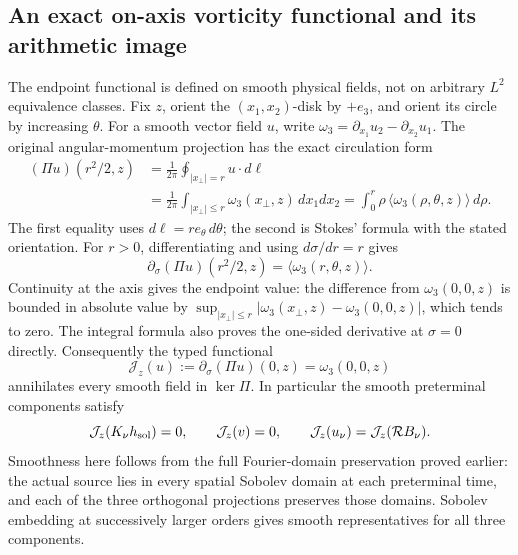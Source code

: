 \subsection*{An exact on-axis vorticity functional and its arithmetic image}

The endpoint functional is defined on smooth physical fields, not on
arbitrary \(L^2\) equivalence classes. Fix \(z\), orient the
\((x_1,x_2)\)-disk by \(+e_3\), and orient its circle by increasing
\(\theta\). For a smooth vector field \(u\), write
\(\omega_3=\partial_{x_1}u_2-\partial_{x_2}u_1\).
The original angular-momentum projection has the exact circulation form
\begin{align*}
 (\Pi u)(r^2/2,z)
 &=\frac1{2\pi}\oint_{|x_\perp|=r}u\cdot d\ell\\
 &=\frac1{2\pi}\int_{|x_\perp|\le r}\omega_3(x_\perp,z)\,dx_1dx_2
 =\int_0^r \rho\,\langle\omega_3(\rho,\theta,z)\rangle\,d\rho.
\end{align*}
The first equality uses \(d\ell=r e_\theta\,d\theta\); the second is
Stokes' formula with the stated orientation. For \(r>0\), differentiating
and using \(d\sigma/dr=r\) gives
\[
 \partial_\sigma(\Pi u)(r^2/2,z)
       =\langle\omega_3(r,\theta,z)\rangle.
\]
Continuity at the axis gives the endpoint value: the difference from
\(\omega_3(0,0,z)\) is bounded in absolute value by
\(\sup_{|x_\perp|\le r}|\omega_3(x_\perp,z)-\omega_3(0,0,z)|\),
which tends to zero. The integral formula also proves the one-sided
derivative at \(\sigma=0\) directly. Consequently the typed functional
\[
 \mathcal J_z(u):=\partial_\sigma(\Pi u)(0,z)
       =\omega_3(0,0,z)
\]
annihilates every smooth field in \(\ker\Pi\). In particular the
smooth preterminal components satisfy
\[
 \mathcal J_z(K_\nu h_{\rm sol})=0,\qquad
 \mathcal J_z(v)=0,\qquad
 \mathcal J_z(u_\nu)=\mathcal J_z(\mathcal R B_\nu).
\]
Smoothness here follows from the full Fourier-domain preservation proved
earlier: the actual source lies in every spatial Sobolev domain at each
preterminal time, and each of the three orthogonal projections preserves
those domains. Sobolev embedding at successively larger orders gives
smooth representatives for all three components.

